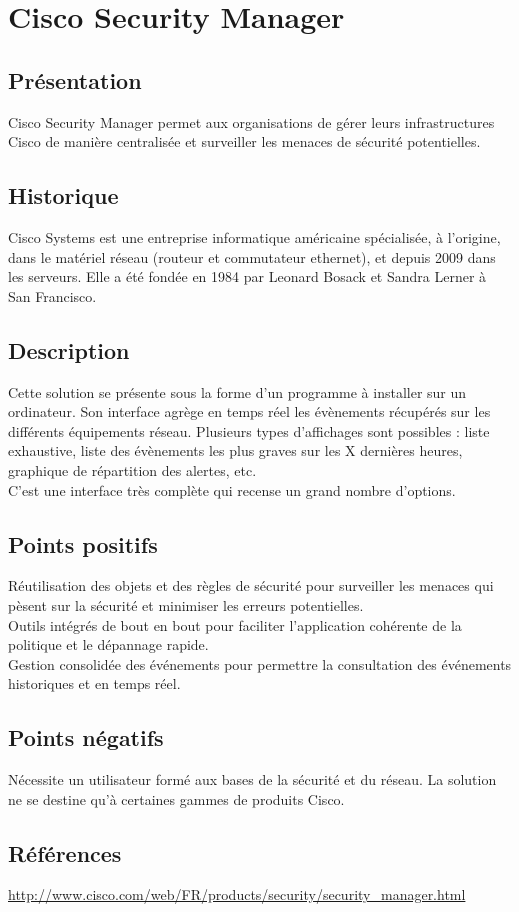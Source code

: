 \section{Cisco Security Manager}
\thispagestyle{plain}
\subsection{Présentation}
Cisco Security Manager permet aux organisations de gérer leurs infrastructures Cisco de manière centralisée et surveiller les menaces de sécurité potentielles.

\subsection{Historique}
Cisco Systems est une entreprise informatique américaine spécialisée, à l’origine, dans le matériel réseau (routeur et commutateur ethernet), et depuis 2009 dans les serveurs. Elle a été fondée en 1984 par Leonard Bosack et Sandra Lerner à San Francisco.

\subsection{Description}
Cette solution se présente sous la forme d'un programme à installer sur un ordinateur. Son interface agrège en temps réel les évènements récupérés sur les différents équipements réseau. Plusieurs types d'affichages sont possibles : liste exhaustive, liste des évènements les plus graves sur les X dernières heures, graphique de répartition des alertes, etc.\\
C'est une interface très complète qui recense un grand nombre d'options.

\subsection{Points positifs}
Réutilisation des objets et des règles de sécurité pour surveiller les menaces qui pèsent sur la sécurité et minimiser les erreurs potentielles.\\
Outils intégrés de bout en bout pour faciliter l'application cohérente de la politique et le dépannage rapide.\\
Gestion consolidée des événements pour permettre la consultation des événements historiques et en temps réel.\\

\subsection{Points négatifs}
Nécessite un utilisateur formé aux bases de la sécurité et du réseau.
La solution ne se destine qu’à certaines gammes de produits Cisco.

\subsection{Références}
\small
\noindent
\url{http://www.cisco.com/web/FR/products/security/security_manager.html}
\normalsize